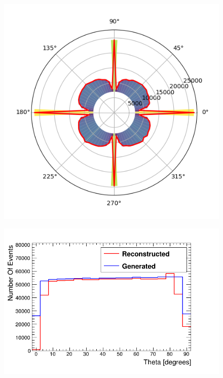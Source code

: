 \begin{figure}[H]
 \centering
 \includegraphics[width=0.6\linewidth]{Chapter5/Figs/Raster/cosmicSimpleHemNoDead_Ciruclarphi.png}
 \label{fig:cirPhiGenVsRecoHem}
\end{figure}


\begin{figure}[H]
 \centering
 \includegraphics[width=0.8\linewidth]{Chapter5/Figs/Raster/hemisphereThetaCompare.png}
 \label{fig:thetaGenVsRecoHem}
\end{figure}


